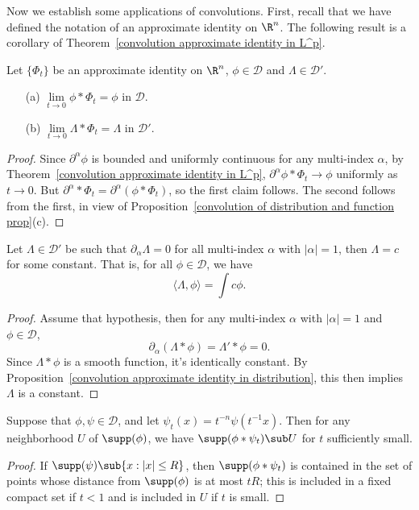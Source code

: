 Now we establish some applications of convolutions. First, recall that we have defined the notation of an approximate identity on $\R^n$. The following result is a corollary of Theorem~\ref{convolution approximate identity in L^p}.
\begin{proposition}\label{convolution approximate identity in distribution}
Let $\{\Phi_t\}$ be an approximate identity on $\R^n$, $\phi\in\mathscr{D}$ and $\Lambda\in\mathscr{D}'$.
\begin{itemize}
\item[(a)] $\lim\limits_{t\to 0}\phi\ast\Phi_t=\phi$ in $\mathscr{D}$.
\item[(b)] $\lim\limits_{t\to 0}\Lambda\ast\Phi_t=\Lambda $ in $\mathscr{D}'$. 
\end{itemize}
\end{proposition}
\begin{proof}
Since $\partial^\alpha\phi$ is bounded and uniformly continuous for any multi-index $\alpha$, by Theorem~\ref{convolution approximate identity in L^p}, $\partial^\alpha\phi\ast\Phi_t\to\phi$ uniformly as $t\to 0$. But $\partial^\alpha\ast\Phi_t=\partial^\alpha(\phi\ast\Phi_t)$, so the first claim follows. The second follows from the first, in view of Proposition~\ref{convolution of distribution and function prop}(c). 
\end{proof}
\begin{proposition}\label{distribution with zero derivative}
Let $\Lambda\in\mathscr{D}'$ be such that $\partial_\alpha\Lambda=0$ for all multi-index $\alpha$ with $|\alpha|=1$, then $\Lambda=c$ for some constant. That is, for all $\phi\in\mathscr{D}$, we have
\[\langle\Lambda,\phi\rangle=\int c\phi.\] 
\end{proposition}
\begin{proof}
Assume that hypothesis, then for any multi-index $\alpha$ with $|\alpha|=1$ and $\phi\in\mathscr{D}$,
\[\partial_\alpha(\Lambda\ast\phi)=\Lambda'\ast\phi=0.\]
Since $\Lambda\ast\phi$ is a smooth function, it's identically constant. By Proposition~\ref{convolution approximate identity in distribution}, this then implies $\Lambda$ is a constant.
\end{proof}
\begin{lemma}\label{support of convolution with approximate identity}
Suppose that $\phi,\psi\in\mathscr{D}$, and let $\psi_t(x)=t^{-n}\psi(t^{-1}x)$. Then for any neighborhood $U$ of $\supp(\phi)$, we have $\supp(\phi\ast\psi_t)\sub U$ for $t$ sufficiently small.
\end{lemma}
\begin{proof}
If $\supp(\psi)\sub\{x:|x|\leq R\}$, then $\supp(\phi\ast\psi_t)$ is contained in the set of points whose distance from $\supp(\phi)$ is at most $tR$; this is included in a fixed compact set if $t<1$ and is included in $U$ if $t$ is small.
\end{proof}
